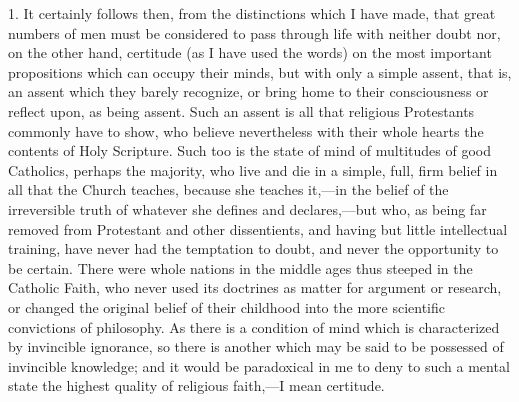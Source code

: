1. It certainly follows then, from the distinctions which I have
made, that great numbers of men must be considered to pass through
life with neither doubt nor, on the other hand, certitude (as I have
used the words) on the most important propositions which can occupy
their minds, but with only a simple assent, that is, an assent
which they barely recognize, or bring home to their consciousness or
reflect upon, as being assent. Such an assent is all that religious
Protestants commonly have to show, who believe nevertheless with their
whole hearts the contents of Holy Scripture. Such too is the state of
mind of multitudes of good Catholics, perhaps the majority, who live
and die in a simple, full, firm belief in all that the Church teaches,
because she teaches it,—in the belief of the irreversible truth of
whatever she defines and declares,—but who, as being far removed
from Protestant and other dissentients, and having but little
intellectual training, have never had the temptation to doubt, and
never the opportunity to be certain. There were whole nations in the
middle ages thus steeped in the Catholic Faith, who never used its
doctrines as matter for argument or research, or changed the original
belief of their childhood into the more scientific convictions of
philosophy. As there is a condition of mind which is characterized by
invincible ignorance, so there is another which may be said to be
possessed of invincible knowledge; and it would be paradoxical in me
to deny to such a mental state the highest quality of religious faith,—I
mean certitude.

